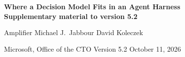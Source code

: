 \documentclass[11pt,letterpaper]{article}
\begin{document}
\thispagestyle{plain}
\begin{center}
  {\Large\sffamily\bfseries Where a Decision Model Fits in an Agent Harness\\[3pt]
   \large Supplementary material to version 5.2\par}
  \vspace{8pt}
  {\normalsize Amplifier \qquad Michael J.\ Jabbour \qquad David Koleczek\par}
  \vspace{2pt}
  {\normalsize Microsoft, Office of the CTO \textperiodcentered{} Version 5.2 \textperiodcentered{} October 11, 2026\par}
\end{center}
\vspace{4pt}

\medskip
{\small\setcounter{tocdepth}{2}\tableofcontents}
\clearpage









\par{\small\raggedright


\par}

\end{document}
